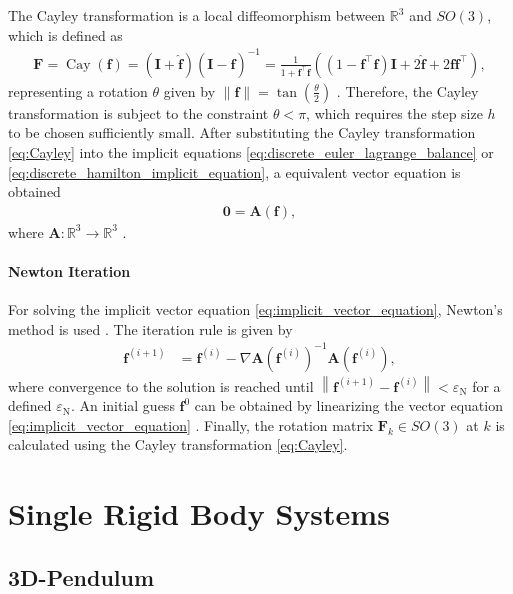 The Cayley transformation is a local diffeomorphism between $\mathbb{R}^3$ and $SO(3)$, which is defined as 
\begin{align} \label{eq:Cayley}
    \bm{F}= \operatorname{Cay}(\bm{f}) = (\bm{I} + \hat{\bm{f}})(\bm{I}-\hat{\bm{f}})^{-1} = \frac{1}{1+\bm{f}^\top \bm{f}}\left((1-\bm{f}^\top \bm{f}) \bm{I}+2\hat{\bm{f}}+2\bm{f}\bm{f}^\top\right),
\end{align}
representing a rotation $\theta$ given by $\lVert \bm{f} \rVert = \tan\left(\frac{\theta}{2}\right)$ \cite{Barbero-Linan2023_Cayley_Formula}. Therefore, the Cayley transformation is subject to the constraint $\theta < \pi$, which requires the step size $h$ to be chosen sufficiently small. After substituting the Cayley transformation \eqref{eq:Cayley} 
into the implicit equations \eqref{eq:discrete_euler_lagrange_balance} or \eqref{eq:discrete_hamilton_implicit_equation}, a 
equivalent vector equation is obtained
\begin{align}\label{eq:implicit_vector_equation}
     \bm{0} = \bm{A}(\bm{f}),
\end{align}
 where $\bm{A}:\mathbb{R}^3 \to \mathbb{R}^3$ \cite{ColomboJimenez2012SO3_Cayley}.

\paragraph{Newton Iteration}

For solving the implicit vector equation \eqref{eq:implicit_vector_equation}, Newton's method is used \cite{Marsden2001}. The iteration rule is given by 
\begin{align}
\bm{f}^{(i+1)} &= \bm{f}^{(i)} - \nabla \bm{A}\!\left(\bm{f}^{(i)}\right)^{-1} \bm{A}\!\left(\bm{f}^{(i)}\right),
\end{align}
where convergence to the solution is reached until $\left\lVert \bm{f}^{(i+1)} - \bm{f}^{(i)} \right\rVert < \varepsilon_{\mathrm N}$ for a defined $\varepsilon_{\mathrm N}$. An initial guess $\bm{f}^0$ can be obtained by linearizing the vector equation \eqref{eq:implicit_vector_equation} \cite{Lee2008}. Finally, the rotation matrix $\bm{F}_k \in SO(3)$ at $k$ is calculated using the Cayley transformation \eqref{eq:Cayley}. 

\section{Single Rigid Body Systems}
\label{sec:single_rigid_body_systems}

\subsection{3D-Pendulum}
\label{sec:discrete_3D_pendulum}

